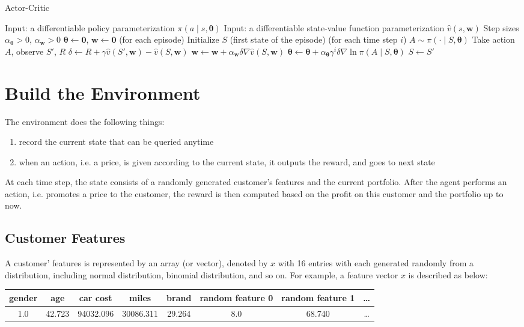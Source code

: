 \documentclass[11pt]{article}
\begin{document}
\begin{algorithm}[H]
\caption{Actor-Critic}
\begin{algorithmic}[1]
\State Input: a differentiable policy parameterization 
\(\pi\left(a\middle|s, \bm{\theta}\right)\)
\State Input: a differentiable state-value function parameterization
\(\hat{v}(s,\bm{w})\)
\State Step sizes \(\alpha_{\bm{\theta}}>0\), \(\alpha_{\bm{w}}>0\)
\State \(\bm{\theta} \gets \bm{0}\), \(\bm{w} \gets \bm{0}\)
\Loop \hspace{0.3mm} (for each episode)
    \State Initialize \(S\) (first state of the episode)
    \Loop \hspace{0.3mm} (for each time step \(i\))
        \State \(A\sim\pi\left(\cdot\middle|S, \bm{\theta}\right)\)
        \State Take action \(A\), observe \(S'\), \(R\)
        \State \(\delta \gets R + \gamma\hat{v}(S',\bm{w})-\hat{v}(S,\bm{w})\)
        \State \(\bm{w} \gets \bm{w} + 
        \alpha_{\bm{w}} \delta\nabla\hat{v}(S,\bm{w})\)
        \State \(\bm{\theta} \gets \bm{\theta} 
        + \alpha_{\bm{\theta}}\gamma^{i}\delta
        \nabla\ln{\pi\left(A\middle|S, \bm{\theta}\right)}\)
        \State \(S \gets S'\)
    \EndLoop
\EndLoop
\end{algorithmic}
\end{algorithm}

\section{Build the Environment}
The environment does the following things:
\begin{enumerate}
    \item record the current state that can be queried anytime
    \item when an action, i.e. a price, is given according to the current 
        state, it outputs the reward, and goes to next state
\end{enumerate}
At each time step, the state consists of a randomly generated customer's 
features and the current portfolio. After the agent performs an action, i.e.
promotes a price to the customer, the reward is then computed based on the 
profit on this customer and the portfolio up to now.

\subsection{Customer Features}
A customer' features is represented by an array (or vector), denoted by \(x\) 
with 16 entries with each generated randomly from a distribution, 
including normal distribution, binomial distribution, and so on. For example, 
a feature vector \(x\) is described as below:
\begin{table}[htpb]
    \centering
    \begin{tabular}{c|c|c|c|c|c|c|c}
        gender & age & car cost & miles & brand & random feature 0 & random 
        feature 1 & \dots\\
        \hline
        1.0 & 42.723 & 94032.096 & 30086.311 & 29.264 & 8.0 & 68.740 & \dots
    \end{tabular}
\end{table}
\end{document}
